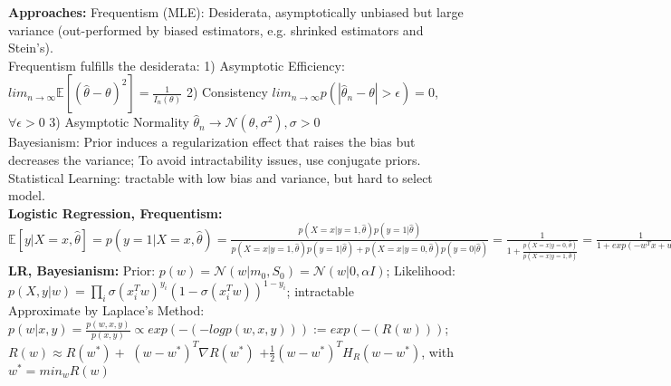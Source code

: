 \textbf{Approaches: } 
Frequentism (MLE): Desiderata, asymptotically unbiased but large variance (out-performed by biased estimators, e.g. shrinked estimators and Stein’s). \\
Frequentism fulfills the desiderata: 1) Asymptotic Efficiency: $lim_{n \rightarrow \infty} \mathbb{E}[(\hat{\theta} - \theta)^2] = \frac{1}{I_{n}(\theta)}$ 2) Consistency $lim_{n \rightarrow \infty} p(|\hat{\theta}_n - \theta| > \epsilon) = 0$, $\forall \epsilon > 0$ 3) Asymptotic Normality $\hat{\theta}_n \rightarrow \mathcal{N}(\theta, \sigma^2), \sigma > 0$
\\ 
Bayesianism: Prior induces a regularization effect that raises the bias but decreases the variance; To avoid intractability issues, use conjugate priors. \\
Statistical Learning: tractable with low bias and variance, but hard to select model.
\\
\textbf{Logistic Regression, Frequentism: } 
$\mathbb{E}[y|X=x, \hat{\theta}] = p(y=1 | X=x, \hat{\theta}) = \frac{p(X=x | y=1, \hat{\theta})p(y=1|\hat{\theta})}{p(X=x | y=1, \hat{\theta})p(y=1|\hat{\theta})+p(X=x | y=0, \hat{\theta})p(y=0|\hat{\theta})} = \frac{1}{1+\frac{p(X=x | y=0, \hat{\theta})}{p(X=x | y=1, \hat{\theta})}} = \frac{1}{1+exp(-w^Tx+w_0)} = \sigma(w^Tx+w_0)$
\\
\textbf{LR, Bayesianism: } 
Prior: $p(w) = \mathcal{N}(w | m_0, S_0) = \mathcal{N}(w | 0, \alpha I)$; Likelihood: $p(X, y|w) = \prod_i \sigma(x_i^Tw)^{y_i}(1-\sigma(x_i^Tw))^{1-y_i}$; intractable \\
Approximate by Laplace's Method:
$p(w | x, y) = \frac{p(w, x, y)}{p(x, y)} \propto exp(-(-log p(w, x, y))) := exp(-(R(w)))$; $R(w) \approx R(w^*)  +$ \sout{$(w - w^*)^T \nabla R(w^*)$} $+ \frac{1}{2}(w - w^*)^T H_R(w - w^*)$, with $w^* = min_w R(w)$ \\
